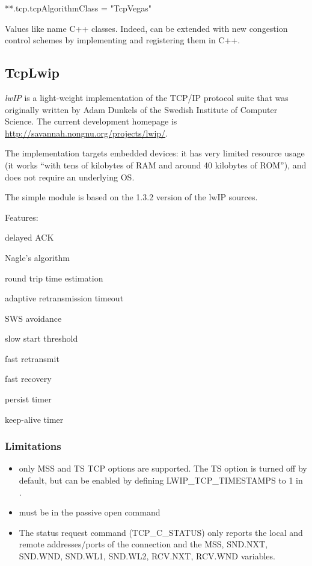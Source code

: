 \begin{inifile}
**.tcp.tcpAlgorithmClass = "TcpVegas"
\end{inifile}

Values like  name C++ classes. Indeed,  can be
extended with new congestion control schemes by implementing and registering
them in C++.



\subsection{TcpLwip}
\label{sec:transport:tcplwip}

\textit{lwIP} is a light-weight implementation of the TCP/IP protocol suite
that was originally written by Adam Dunkels of the Swedish Institute of
Computer Science. The current development homepage is
\url{http://savannah.nongnu.org/projects/lwip/}.

The implementation targets embedded devices: it has very limited resource usage
(it works ``with tens of kilobytes of RAM and around 40 kilobytes of ROM''), and
does not require an underlying OS.

The  simple module is based on the 1.3.2 version of
the lwIP sources.

Features:

\begin{compactitem}
\item delayed ACK
\item Nagle's algorithm
\item round trip time estimation
\item adaptive retransmission timeout
\item SWS avoidance
\item slow start threshold
\item fast retransmit
\item fast recovery
\item persist timer
\item keep-alive timer
\end{compactitem}

\subsubsection*{Limitations}

\begin{itemize}
  \item only MSS and TS TCP options are supported. The TS option is turned off
        by default, but can be enabled by defining LWIP\_TCP\_TIMESTAMPS to 1
        in .
  \item {} must be  in the passive open command
  \item The status request command (TCP\_C\_STATUS) only reports the
          local and remote addresses/ports of the connection and
          the MSS, SND.NXT, SND.WND, SND.WL1, SND.WL2, RCV.NXT, RCV.WND variables.
\end{itemize}

